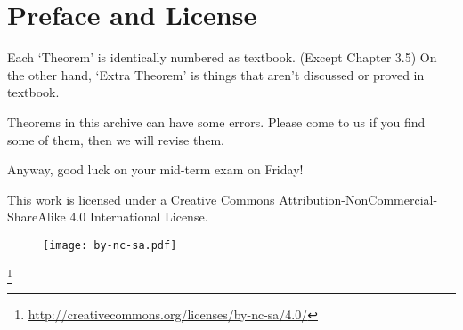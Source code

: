 \chapter*{Preface and License}
\lipsum[1-2]

Each `Theorem' is identically numbered as textbook. (Except Chapter 3.5) On the other hand, `Extra Theorem' is things that aren't discussed or proved in textbook.

Theorems in this archive can have some errors. Please come to us if you find some of them, then we will revise them.

Anyway, good luck on your mid-term exam on Friday!

This work is licensed under a Creative Commons Attribution-NonCommercial-ShareAlike 4.0 International License.
\begin{figure}[h]
	\centering
	\texttt{[image: by-nc-sa.pdf]}
\end{figure} \footnote{\url{http://creativecommons.org/licenses/by-nc-sa/4.0/}}